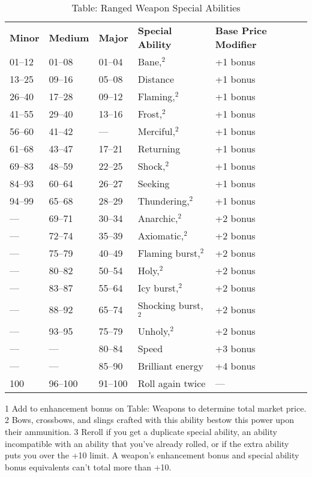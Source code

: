 \begin{table}[]
\sffamily
\caption{Table: Ranged Weapon Special Abilities}
\begin{tabular}{lllll}
\textbf{Minor} & \textbf{Medium} & \textbf{Major} & \textbf{Special Ability} & \textbf{Base Price Modifier}\\
01–12 & 01–08 & 01–04 & Bane,\(^{2}\) & +1 bonus\\
13–25 & 09–16 & 05–08 & Distance & +1 bonus\\
26–40 & 17–28 & 09–12 & Flaming,\(^{2}\) & +1 bonus\\
41–55 & 29–40 & 13–16 & Frost,\(^{2}\) & +1 bonus\\
56–60 & 41–42 & — & Merciful,\(^{2}\) & +1 bonus\\
61–68 & 43–47 & 17–21 & Returning & +1 bonus\\
69–83 & 48–59 & 22–25 & Shock,\(^{2}\) & +1 bonus\\
84–93 & 60–64 & 26–27 & Seeking & +1 bonus\\
94–99 & 65–68 & 28–29 & Thundering,\(^{2}\) & +1 bonus\\
— & 69–71 & 30–34 & Anarchic,\(^{2}\) & +2 bonus\\
— & 72–74 & 35–39 & Axiomatic,\(^{2}\) & +2 bonus\\
— & 75–79 & 40–49 & Flaming burst,\(^{2}\) & +2 bonus\\
— & 80–82 & 50–54 & Holy,\(^{2}\) & +2 bonus\\
— & 83–87 & 55–64 & Icy burst,\(^{2}\) & +2 bonus\\
— & 88–92 & 65–74 & Shocking burst,\(^{2}\) & +2 bonus\\
— & 93–95 & 75–79 & Unholy,\(^{2}\) & +2 bonus\\
— & — & 80–84 & Speed & +3 bonus\\
— & — & 85–90 & Brilliant energy & +4 bonus\\
100 & 96–100 & 91–100 & Roll again twice & —\\

\end{tabular}
1 Add to enhancement bonus on Table: Weapons to determine total market price.
2 Bows, crossbows, and slings crafted with this ability bestow this power upon their ammunition.
3 Reroll if you get a duplicate special ability, an ability incompatible with an ability that you've already rolled, or if the extra ability puts you over the +10 limit. A weapon's enhancement bonus and special ability bonus equivalents can't total more than +10.
\end{table}
